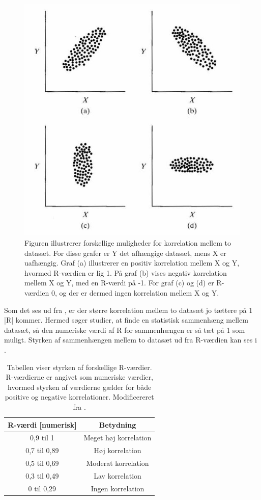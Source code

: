 \begin{figure}[H]
\centering
\includegraphics[width=.35\textwidth]{figures/dHTAanalyse/r_vaerdi}
\caption{Figuren illustrerer forskellige muligheder for korrelation mellem to datasæt. For disse grafer er Y det afhængige datasæt, mens X er uafhængig. Graf (a) illustrerer en positiv korrelation mellem X og Y, hvormed R-værdien er lig 1. På graf (b) vises negativ korrelation mellem X og Y, med en R-værdi på -1. For graf (c) og (d) er R-værdien 0, og der er dermed ingen korrelation mellem X og Y. \citep{Zar2010}} \label{fig:r_vaerdi}
\end{figure}\vspace{-.25cm}

Som det ses ud fra , er der større korrelation mellem to datasæt jo tættere på 1 |R| kommer. Hermed søger studier, at finde en statistisk sammenhæng mellem datasæt, så den numeriske værdi af R for sammenhængen er så tæt på 1 som muligt. Styrken af sammenhængen mellem to datasæt ud fra R-værdien kan ses i . \\

\begin{table}[H]
\centering
\begin{tabular}{cc}
	\hline
\rowcolor[HTML]{C0C0C0} 
R-værdi {[}numerisk{]} & Betydning  \\ \hline
0,9 til 1              & Meget høj korrelation              \\
0,7 til 0,89            & Høj korrelation                    \\
0,5 til 0,69            & Moderat korrelation                \\
0,3 til 0,49            & Lav korrelation                    \\
0 til 0,29              & Ingen korrelation                  \\ \hline
\end{tabular}
\caption{Tabellen viser styrken af forskellige R-værdier. R-værdierne er angivet som numeriske værdier, hvormed styrken af værdierne gælder for både positive og negative korrelationer. Modificereret fra .}
\label{tab:styrke_r}
\end{table} \vspace{-.25cm}


